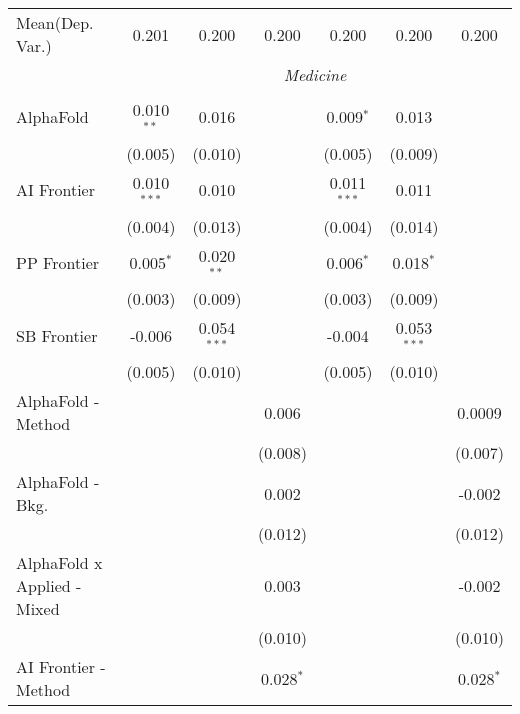 \begin{tabular}{lcccccc}
Mean(Dep. Var.) & 0.201 & 0.200 & 0.200 & 0.200 & 0.200 & 0.200 \\
 & \multicolumn{6}{c}{\textit{Medicine}} \\ \\
   AlphaFold                   & 0.010$^{**}$  & 0.016         &             & 0.009$^{*}$   & 0.013         &   \\   
                               & (0.005)       & (0.010)       &             & (0.005)       & (0.009)       &   \\   
   AI Frontier                 & 0.010$^{***}$ & 0.010         &             & 0.011$^{***}$ & 0.011         &   \\   
                               & (0.004)       & (0.013)       &             & (0.004)       & (0.014)       &   \\   
   PP Frontier                 & 0.005$^{*}$   & 0.020$^{**}$  &             & 0.006$^{*}$   & 0.018$^{*}$   &   \\   
                               & (0.003)       & (0.009)       &             & (0.003)       & (0.009)       &   \\   
   SB Frontier                 & -0.006        & 0.054$^{***}$ &             & -0.004        & 0.053$^{***}$ &   \\   
                               & (0.005)       & (0.010)       &             & (0.005)       & (0.010)       &   \\   
   AlphaFold - Method          &               &               & 0.006       &               &               & 0.0009\\   
                               &               &               & (0.008)     &               &               & (0.007)\\   
   AlphaFold - Bkg.            &               &               & 0.002       &               &               & -0.002\\   
                               &               &               & (0.012)     &               &               & (0.012)\\   
   AlphaFold x Applied - Mixed &               &               & 0.003       &               &               & -0.002\\   
                               &               &               & (0.010)     &               &               & (0.010)\\   
   AI Frontier - Method        &               &               & 0.028$^{*}$ &               &               & 0.028$^{*}$\\   

\end{tabular}
